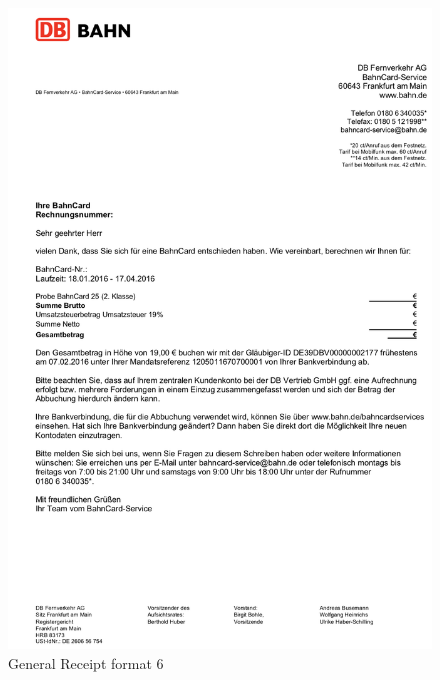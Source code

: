 \begin{figure}[H]
\centering
\includegraphics[scale=0.6]{images/GR-Formats/gs-format-6.png}
\caption{General Receipt format 6}
\label{ls_format2}
\end{figure}

